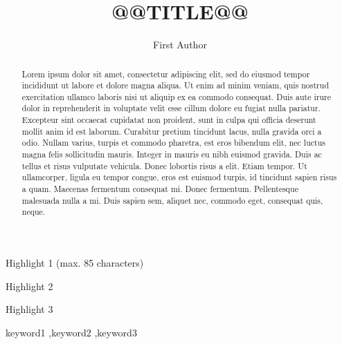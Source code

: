\documentclass[a4paper,fleqn]{cas-sc}
\begin{document}
\let\WriteBookmarks\relax
\def\floatpagepagefraction{1}
\def\textpagefraction{.001}


\title[mode = title]{@@TITLE@@}

\author[1]{First Author}
\cormark[1]



\begin{abstract}
Lorem ipsum dolor sit amet, consectetur adipiscing elit, sed do eiusmod tempor incididunt ut labore et dolore magna aliqua. Ut enim ad minim veniam, quis nostrud exercitation ullamco laboris nisi ut aliquip ex ea commodo consequat. Duis aute irure dolor in reprehenderit in voluptate velit esse cillum dolore eu fugiat nulla pariatur. Excepteur sint occaecat cupidatat non proident, sunt in culpa qui officia deserunt mollit anim id est laborum. Curabitur pretium tincidunt lacus, nulla gravida orci a odio. Nullam varius, turpis et commodo pharetra, est eros bibendum elit, nec luctus magna felis sollicitudin mauris. Integer in mauris eu nibh euismod gravida. Duis ac tellus et risus vulputate vehicula. Donec lobortis risus a elit. Etiam tempor. Ut ullamcorper, ligula eu tempor congue, eros est euismod turpis, id tincidunt sapien risus a quam. Maecenas fermentum consequat mi. Donec fermentum. Pellentesque malesuada nulla a mi. Duis sapien sem, aliquet nec, commodo eget, consequat quis, neque.
\end{abstract}

\begin{highlights}
\item Highlight 1 (max. 85 characters)
\item Highlight 2
\item Highlight 3
\end{highlights}

\begin{keywords}
keyword1 \sep keyword2 \sep keyword3
\end{keywords}
\end{document}
